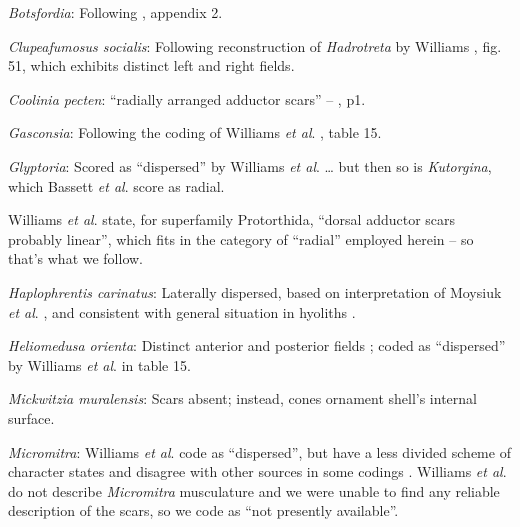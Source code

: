 \documentclass[openany]{book}
\theoremstyle{definition}
\theoremstyle{definition}
\theoremstyle{definition}
\theoremstyle{remark}
\begin{document}
\hypertarget{Botsfordia-coding-15}{}
\emph{Botsfordia}: Following \citet{Williams1998Thediversity}, appendix
2.

\hypertarget{Clupeafumosus_socialis-coding-15}{}
\emph{Clupeafumosus socialis}: Following reconstruction of
\emph{Hadrotreta} by Williams
\citeyearpar{Williams2000LinguliformeaCraniiformea}, fig. 51, which
exhibits distinct left and right fields.

\hypertarget{Coolinia_pecten-coding-15}{}
\emph{Coolinia pecten}: ``radially arranged adductor scars'' --
\citet{Bassett2017Earliestontogeny}, p1.

\hypertarget{Gasconsia-coding-15}{}
\emph{Gasconsia}: Following the coding of Williams \emph{et al}.
\citeyearpar{Williams2000LinguliformeaCraniiformea}, table 15.

\hypertarget{Glyptoria-coding-15}{}
\emph{Glyptoria}: Scored as ``dispersed'' by Williams \emph{et al}.
\citeyearpar{Williams1998Thediversity} \ldots{} but then so is
\emph{Kutorgina}, which Bassett \emph{et al}.
\citeyearpar{Bassett2001Functionalmorphology} score as radial.

Williams \emph{et al}.
\citeyearpar{Williams2000LinguliformeaCraniiformea} state, for
superfamily Protorthida, ``dorsal adductor scars probably linear'',
which fits in the category of ``radial'' employed herein -- so that's
what we follow.

\hypertarget{Haplophrentis_carinatus-coding-15}{}
\emph{Haplophrentis carinatus}: Laterally dispersed, based on
interpretation of Moysiuk \emph{et al}.
\citeyearpar{Moysiuk2017Hyolithsare}, and consistent with general
situation in hyoliths \citep[see][]{Dzik1980Ontogenyof}.

\hypertarget{Heliomedusa_orienta-coding-15}{}
\emph{Heliomedusa orienta}: Distinct anterior and posterior fields
\citep{Chen2007Reinterpretationof}; coded as ``dispersed'' by Williams
\emph{et al}. \citeyearpar{Williams2000LinguliformeaCraniiformea} in
table 15.

\hypertarget{Mickwitzia_muralensis-coding-15}{}
\emph{Mickwitzia muralensis}: Scars absent; instead, cones ornament
shell's internal surface.

\hypertarget{Micromitra-coding-15}{}
\emph{Micromitra}: Williams \emph{et al}.
\citeyearpar{Williams1998Thediversity} code as ``dispersed'', but have a
less divided scheme of character states and disagree with other sources
in some codings \citep[e.g.][in
Kutorginates]{Bassett2001Functionalmorphology}. Williams \emph{et al}.
\citeyearpar{Williams2000LinguliformeaCraniiformea} do not describe
\emph{Micromitra} musculature and we were unable to find any reliable
description of the scars, so we code as ``not presently available''.
\end{document}

